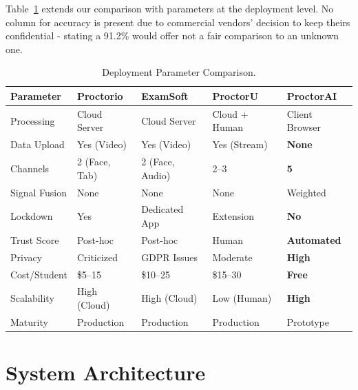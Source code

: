 \documentclass[runningheads]{llncs}
\begin{document}
Table~\ref{tab:params} extends our comparison with parameters at the deployment level. No column for accuracy is present due to commercial vendors' decision to keep theirs confidential - stating a 91.2\% would offer not a fair comparison to an unknown one.

\begin{table}[htbp]
\caption{Deployment Parameter Comparison.}\label{tab:params}
\centering
\setlength{\tabcolsep}{2pt}
\scriptsize
\begin{tabular}{@{}p{2.2cm}p{1.8cm}p{1.8cm}p{2.0cm}p{2.2cm}@{}}
\toprule
\textbf{Parameter} & \textbf{Proctorio} & \textbf{ExamSoft} & \textbf{ProctorU} & \textbf{ProctorAI} \\
\midrule
Processing         & Cloud Server          & Cloud Server           & Cloud + Human    & Client Browser \\
Data Upload        & Yes (Video)           & Yes (Video)            & Yes (Stream)     & \textbf{None} \\
Channels           & 2 (Face, Tab)         & 2 (Face, Audio)        & 2--3             & \textbf{5} \\
Signal Fusion      & None                  & None                   & None             & Weighted \\
Lockdown           & Yes                   & Dedicated App          & Extension        & \textbf{No} \\
Trust Score        & Post-hoc              & Post-hoc               & Human            & \textbf{Automated} \\
Privacy            & Criticized            & GDPR Issues            & Moderate         & \textbf{High} \\
Cost/Student       & \$5--15               & \$10--25               & \$15--30         & \textbf{Free} \\
Scalability        & High (Cloud)          & High (Cloud)           & Low (Human)      & \textbf{High} \\
Maturity           & Production            & Production             & Production       & Prototype \\
\bottomrule
\end{tabular}
\end{table}

\section{System Architecture}\label{sec:arch}
\end{document}
